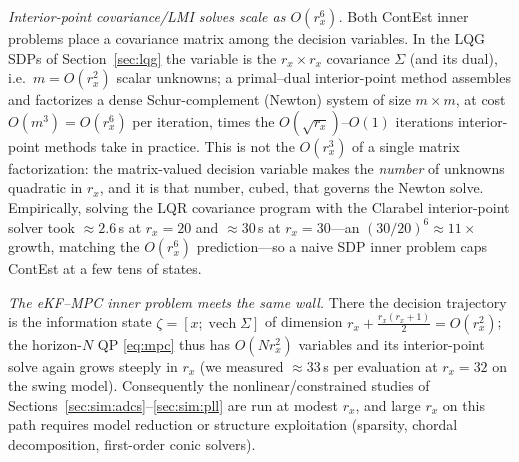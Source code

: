 \documentclass[twocolumn,amsthm]{autart}
\begin{document}
\emph{Interior-point covariance/LMI solves scale as $O(r_x^6)$.} Both ContEst
inner problems place a covariance matrix among the decision variables. In the LQG
SDPs of Section~\ref{sec:lqg} the variable is the $r_x\times r_x$ covariance
$\Sigma$ (and its dual), i.e.\ $m=O(r_x^2)$ scalar unknowns; a primal--dual
interior-point method assembles and factorizes a dense Schur-complement (Newton)
system of size $m\times m$, at cost $O(m^3)=O(r_x^6)$ per iteration, times the
$O(\sqrt{r_x})$--$O(1)$ iterations interior-point methods take in practice. This is
not the $O(r_x^3)$ of a single matrix factorization: the matrix-valued decision
variable makes the \emph{number} of unknowns quadratic in $r_x$, and it is that
number, cubed, that governs the Newton solve. Empirically, solving the LQR
covariance program with the Clarabel interior-point solver took
$\approx\!2.6\,$s at $r_x=20$ and $\approx\!30\,$s at $r_x=30$---an
$(30/20)^6\!\approx\!11\times$ growth, matching the $O(r_x^6)$ prediction---so a
naive SDP inner problem caps ContEst at a few tens of states.

\emph{The eKF--MPC inner problem meets the same wall.} There the decision trajectory
is the information state $\zeta=[x;\operatorname{vech}\Sigma]$ of dimension
$r_x+\tfrac{r_x(r_x+1)}{2}=O(r_x^2)$; the horizon-$N$ QP \eqref{eq:mpc} thus has
$O(N r_x^2)$ variables and its interior-point solve again grows steeply in $r_x$
(we measured $\approx\!33\,$s per evaluation at $r_x=32$ on the swing model).
Consequently the nonlinear/constrained studies of
Sections~\ref{sec:sim:adcs}--\ref{sec:sim:pll} are run at modest $r_x$, and
large $r_x$ on this path requires model reduction or structure exploitation
(sparsity, chordal decomposition, first-order conic solvers).
\end{document}
